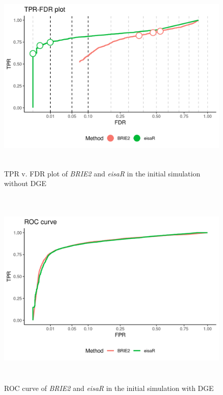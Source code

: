 \begin{figure}[!htb]
\begin{center}
\includegraphics[width=6in,height=3.7in]{../figures/simulation/naive_simulation_FDR.png}
\end{center}
\caption{TPR v. FDR plot of \emph{BRIE2} and \emph{eisaR} in the initial simulation without DGE}
\label{fig:naive_sim_FDR}
\end{figure}

\begin{figure}[!htb]
\begin{center}
\includegraphics[width=6in,height=3.8in]{../figures/simulation/naive_simulation_DGE_ROC.png}
\end{center}
\caption{ROC curve of \emph{BRIE2} and \emph{eisaR} in the initial simulation with DGE}
\label{fig:naive_sim_DGE_ROC}
\end{figure}

